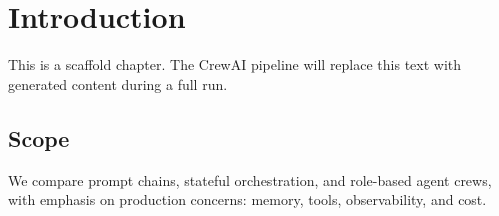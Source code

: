 \section{Introduction}
\label{sec:intro}

This is a scaffold chapter. The CrewAI pipeline will replace this text with
generated content during a full run.

\subsection{Scope}

We compare prompt chains, stateful orchestration, and role-based agent crews,
with emphasis on production concerns: memory, tools, observability, and cost.
